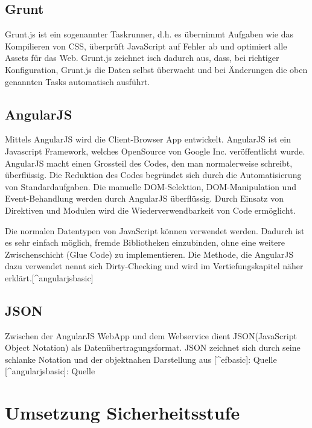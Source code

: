 \subsection{Grunt}\label{grunt}

Grunt.js ist ein sogenannter Taskrunner, d.h. es übernimmt Aufgaben wie
das Kompilieren von CSS, überprüft JavaScript auf Fehler ab und
optimiert alle Assets für das Web. Grunt.js zeichnet isch dadurch aus,
dass, bei richtiger Konfiguration, Grunt.js die Daten selbst überwacht
und bei Änderungen die oben genannten Tasks automatisch ausführt.

\subsection{AngularJS}\label{angularjs}

Mittels AngularJS wird die Client-Browser App entwickelt. AngularJS ist
ein Javascript Framework, welches OpenSource von Google Inc.
veröffentlicht wurde. AngularJS macht einen Grossteil des Codes, den man
normalerweise schreibt, überflüssig. Die Reduktion des Codes begründet
sich durch die Automatisierung von Standardaufgaben. Die manuelle
DOM-Selektion, DOM-Manipulation und Event-Behandlung werden durch
AngularJS überflüssig. Durch Einsatz von Direktiven und Modulen wird die
Wiederverwendbarkeit von Code ermöglicht.

Die normalen Datentypen von JavaScript können verwendet werden. Dadurch
ist es sehr einfach möglich, fremde Bibliotheken einzubinden, ohne eine
weitere Zwischenschicht (Glue Code) zu implementieren. Die Methode, die
AngularJS dazu verwendet nennt sich Dirty-Checking und wird im
Vertiefungskapitel näher erklärt.{[}\^{}angularjsbasic{]}

\subsection{JSON}\label{json}

Zwischen der AngularJS WebApp und dem Webservice dient JSON(JavaScript
Object Notation) als Datenübertragungsformat. JSON zeichnet sich durch
seine schlanke Notation und der objektnahen Darstellung aus
{[}\^{}efbasic{]}: Quelle \autocite{efbasic} {[}\^{}angularjsbasic{]}:
Quelle \autocite{angularjsbasic}

\newpage

\section{Umsetzung Sicherheitsstufe}\label{umsetzung-sicherheitsstufe}

